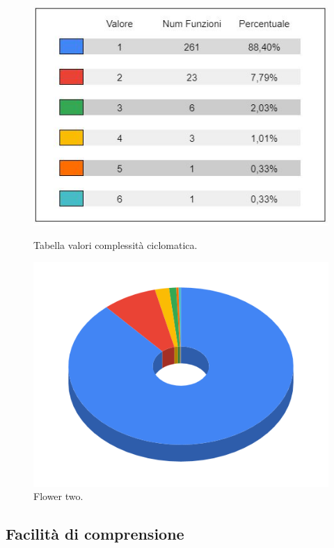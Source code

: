 \begin{figure}[!tbp]
  \centering
  \begin{minipage}[b]{0.43\textwidth}
    \includegraphics[width=\textwidth]{source/sections/images/tabella_CC.JPG}
    \caption{Tabella valori complessità ciclomatica.}
  \end{minipage}
  \hfill
  \begin{minipage}[b]{0.51\textwidth}
    \includegraphics[width=\textwidth]{source/sections/images/CC.png}
    \caption{Flower two.}
  \end{minipage}
\end{figure}

\subsection{Facilità di comprensione}

